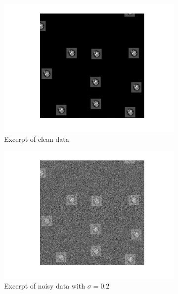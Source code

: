 \documentclass[english]{article}
\numberwithin{equation}{section}
\theoremstyle{plain}
\theoremstyle{definition}
\theoremstyle{remark}
\theoremstyle{plain}
\theoremstyle{remark}
\theoremstyle{plain}
\theoremstyle{plain}
\begin{document}
\begin{figure}[ht!]
    \advance\leftskip-4cm
   \advance\rightskip-4cm


	\begin{subfigure}{.5\textwidth}
		\centering
	\includegraphics[scale=0.5]{data2D_clean}
\caption{Excerpt of clean data}
\label{fig:data2D_clean}
	\end{subfigure}%
	\begin{subfigure}{.5\textwidth}
	\centering
\includegraphics[scale=0.5]{data2D_noisy_02}
\caption{Excerpt of noisy data with $\sigma=0.2$}
\label{fig:data2D_noisy_02}
	\end{subfigure}
	\begin{subfigure}{.5\textwidth}

\end{subfigure}
\end{figure}
\end{document}
